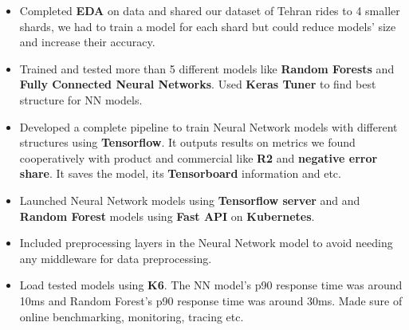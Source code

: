 {\begin{itemize}[label=\textbullet]
            \item Completed \textbf{EDA} on data and shared our dataset of Tehran rides to 4 smaller shards,
                  we had to train a model for each shard but could reduce models' size and increase their accuracy.
            \item Trained and tested more than 5 different models like \textbf{Random Forests} and \textbf{Fully Connected Neural Networks}. Used \textbf{Keras Tuner} to find best structure for NN models.
            \item Developed a complete pipeline to train Neural Network models with different structures using \textbf{Tensorflow}. It outputs results on metrics we found cooperatively with product and commercial like \textbf{R2} and \textbf{negative error share}. It saves the model, its \textbf{Tensorboard} information and etc.
            \item Launched Neural Network models using \textbf{Tensorflow server} and and \textbf{Random Forest} models using \textbf{Fast API} on \textbf{Kubernetes}.
            \item Included preprocessing layers in the Neural Network model to avoid needing any middleware for data preprocessing.
            \item Load tested models using \textbf{K6}. The NN model's p90 response time was around 10ms and Random Forest's p90 response time was around 30ms. Made sure of online benchmarking, monitoring, tracing etc.
      \end{itemize}
}

\vspace{.5cm}


